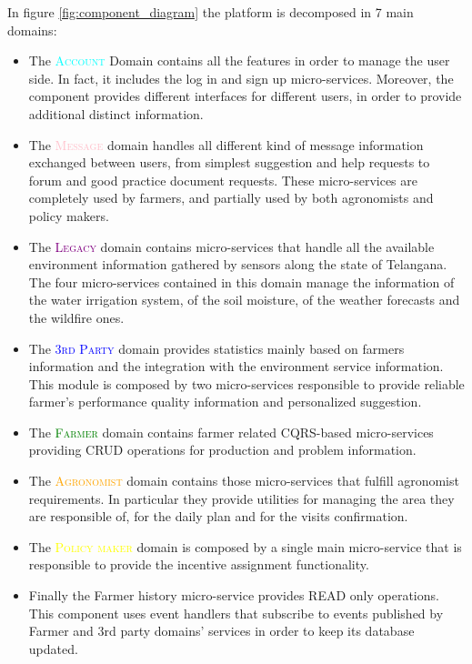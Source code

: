 In figure \ref{fig:component_diagram} the platform is decomposed in 7 main domains:
\begin{itemize}
    \item The \textsc{\textcolor{cyan}{Account}} Domain contains all the features in order to manage the user side. In fact, it includes the log in and sign up micro-services. Moreover, the component provides different interfaces for different users, in order to provide additional distinct information.
    \item The \textsc{\textcolor{pink}{Message}} domain handles all different kind of message information exchanged between users, from simplest suggestion and help requests to forum and good practice document requests. These micro-services are completely used by farmers, and partially used by both agronomists and policy makers.
    \item The \textsc{\textcolor{purple}{Legacy}} domain contains micro-services that handle all the available environment information gathered by sensors along the state of Telangana. The four micro-services contained in this domain manage the information of the water irrigation system, of the soil moisture, of the weather forecasts and the wildfire ones.
    \item The \textsc{\textcolor{blue}{3rd Party}} domain provides statistics mainly based on farmers information and the integration with the environment service information. This module is composed by two micro-services responsible to provide reliable farmer's performance quality information and personalized suggestion.
    \item The \textsc{\textcolor{green}{Farmer}} domain contains farmer related CQRS-based micro-services providing CRUD operations for production and problem information.
    \item The \textsc{\textcolor{orange}{Agronomist}} domain contains those micro-services that fulfill agronomist requirements. In particular they provide utilities for managing the area they are responsible of, for the daily plan and for the visits confirmation.
    \item The \textsc{\textcolor{yellow}{Policy maker}} domain is composed by a single main micro-service that is responsible to provide the incentive assignment functionality.
    \item Finally the Farmer history micro-service provides READ only operations. This component uses event handlers that subscribe to events published by Farmer and 3rd party domains' services in order to keep its database updated.
\end{itemize}



